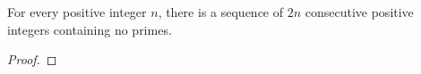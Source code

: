 
\begin{theorem}
  For every positive integer $n$, there is a sequence of $2n$ consecutive
  positive integers containing no primes.
\end{theorem}

\begin{proof}
\end{proof}
